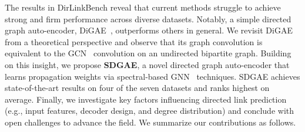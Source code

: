 The results in DirLinkBench reveal that current methods struggle to achieve strong and firm performance across diverse datasets. Notably, a simple directed graph auto-encoder, DiGAE~\cite{digae}, outperforms others in general. We revisit DiGAE from a theoretical perspective and observe that its graph convolution is equivalent to the GCN~\cite{gcn} convolution on an undirected bipartite graph. Building on this insight, we propose \textbf{SDGAE}, a novel directed graph auto-encoder that learns propagation weights via spectral-based GNN~\cite{gprgnn} techniques. SDGAE achieves state-of-the-art results on four of the seven datasets and ranks highest on average. Finally, we investigate key factors influencing directed link prediction (e.g., input features, decoder design, and degree distribution) and conclude with open challenges to advance the field.
We summarize our contributions as follows.
